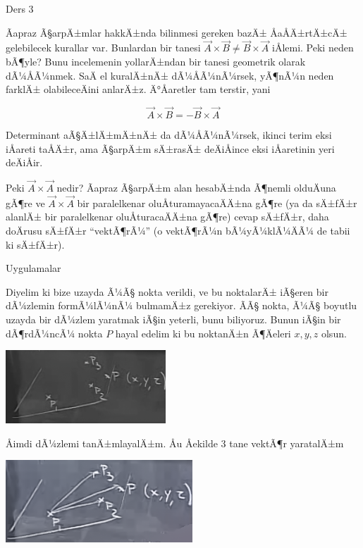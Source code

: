 \documentclass[12pt,fleqn]{article}\usepackage{../../common}
\begin{document}
Ders 3

Ãapraz Ã§arpÄ±mlar hakkÄ±nda bilinmesi gereken bazÄ± ÅaÅÄ±rtÄ±cÄ± gelebilecek
kurallar var. Bunlardan bir tanesi $\vec{A} \times \vec{B} \ne \vec{B}
\times \vec{A}$ iÅlemi. Peki neden bÃ¶yle? Bunu incelemenin yollarÄ±ndan bir 
tanesi 
geometrik olarak dÃ¼ÅÃ¼nmek. SaÄ el kuralÄ±nÄ± dÃ¼ÅÃ¼nÃ¼rsek, yÃ¶nÃ¼n neden 
farklÄ± olabileceÄini anlarÄ±z. Ä°Åaretler tam terstir, yani

$$  \vec{A} \times \vec{B} = - \vec{B}\times \vec{A} $$

Determinant aÃ§Ä±lÄ±mÄ±nÄ± da dÃ¼ÅÃ¼nÃ¼rsek, ikinci terim eksi iÅareti taÅÄ±r, ama
Ã§arpÄ±m sÄ±rasÄ± deÄiÅince eksi iÅaretinin yeri deÄiÅir. 

Peki $\vec{A} \times \vec{A}$ nedir? Ãapraz Ã§arpÄ±m alan hesabÄ±nda Ã¶nemli
olduÄuna gÃ¶re ve $\vec{A} \times \vec{A}$ bir paralelkenar
oluÅturamayacaÄÄ±na gÃ¶re (ya da sÄ±fÄ±r alanlÄ± bir paralelkenar oluÅturacaÄÄ±na
gÃ¶re) cevap sÄ±fÄ±r, daha doÄrusu sÄ±fÄ±r ``vektÃ¶rÃ¼'' (o vektÃ¶rÃ¼n bÃ¼yÃ¼klÃ¼ÄÃ¼ de
tabii ki sÄ±fÄ±r).

Uygulamalar

Diyelim ki bize uzayda Ã¼Ã§ nokta verildi, ve bu noktalarÄ± iÃ§eren bir dÃ¼zlemin
formÃ¼lÃ¼nÃ¼ bulmamÄ±z gerekiyor. ÃÃ§ nokta, Ã¼Ã§ boyutlu uzayda bir dÃ¼zlem yaratmak
iÃ§in yeterli, bunu biliyoruz. Bunun iÃ§in bir dÃ¶rdÃ¼ncÃ¼ nokta $P$ hayal
edelim ki bu noktanÄ±n Ã¶Äeleri $x,y,z$ olsun.


\begin{center}
\includegraphics[width=6cm]{3_1.png}
\end{center}


Åimdi dÃ¼zlemi tanÄ±mlayalÄ±m. Åu Åekilde 3 tane vektÃ¶r yaratalÄ±m


\begin{center}
\includegraphics[width=7cm]{3_2.png}
\end{center}
\end{document}
